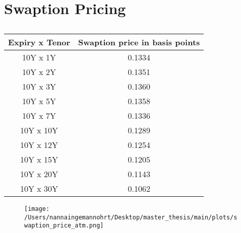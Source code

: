 \section{Swaption Pricing}

\begin{table}[H]
    \centering
    \begin{tabular}{cc}
      \toprule
      \textbf{Expiry x Tenor} & \textbf{Swaption price in basis points}\\
      \midrule
      \rowcolor{lightgray!40} 10Y x 1Y &0.1334 \\
      10Y x 2Y  &0.1351 \\
      \rowcolor{lightgray!40} 10Y x 3Y  &0.1360\\
      10Y x 5Y  &0.1358 \\
      \rowcolor{lightgray!40} 10Y x 7Y  &0.1336 \\
      10Y x 10Y &0.1289\\
      \rowcolor{lightgray!40} 10Y x 12Y &0.1254 \\
      10Y x 15Y & 0.1205 \\
      \rowcolor{lightgray!40} 10Y x 20Y &0.1143\\
      10Y x 30Y &0.1062 \\
      \bottomrule
    \end{tabular}
    \caption{}
    \label{tab:swaption_price_atm}
\end{table}
\noindent

\begin{figure}[H]
    \centering
    \texttt{[image: /Users/nannaingemannohrt/Desktop/master\_thesis/main/plots/swaption\_price\_atm.png]}
    \caption{}
    \label{fig:swaption_price_atm}
\end{figure}
\noindent